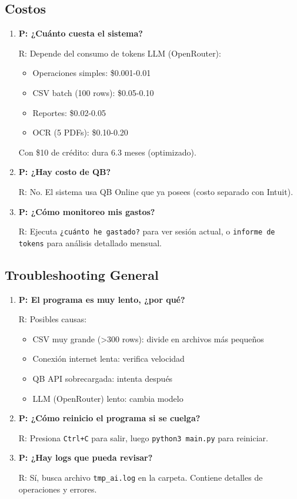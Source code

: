 \documentclass[12pt,oneside]{article}
\begin{document}
\subsection{Costos}

\begin{enumerate}
    \item \textbf{P: ¿Cuánto cuesta el sistema?}
    
    R: Depende del consumo de tokens LLM (OpenRouter):
    \begin{itemize}
        \item Operaciones simples: \$0.001-0.01
        \item CSV batch (100 rows): \$0.05-0.10
        \item Reportes: \$0.02-0.05
        \item OCR (5 PDFs): \$0.10-0.20
    \end{itemize}
    Con \$10 de crédito: dura 6.3 meses (optimizado).
    
    \item \textbf{P: ¿Hay costo de QB?}
    
    R: No. El sistema usa QB Online que ya posees (costo separado con Intuit).
    
    \item \textbf{P: ¿Cómo monitoreo mis gastos?}
    
    R: Ejecuta \texttt{¿cuánto he gastado?} para ver sesión actual, o \texttt{informe de tokens} para análisis detallado mensual.
    
\end{enumerate}

\subsection{Troubleshooting General}

\begin{enumerate}
    \item \textbf{P: El programa es muy lento, ¿por qué?}
    
    R: Posibles causas:
    \begin{itemize}
        \item CSV muy grande (>300 rows): divide en archivos más pequeños
        \item Conexión internet lenta: verifica velocidad
        \item QB API sobrecargada: intenta después
        \item LLM (OpenRouter) lento: cambia modelo
    \end{itemize}
    
    \item \textbf{P: ¿Cómo reinicio el programa si se cuelga?}
    
    R: Presiona \texttt{Ctrl+C} para salir, luego \texttt{python3 main.py} para reiniciar.
    
    \item \textbf{P: ¿Hay logs que pueda revisar?}
    
    R: Sí, busca archivo \texttt{tmp\_ai.log} en la carpeta. Contiene detalles de operaciones y errores.
    
\end{enumerate}
\end{document}
